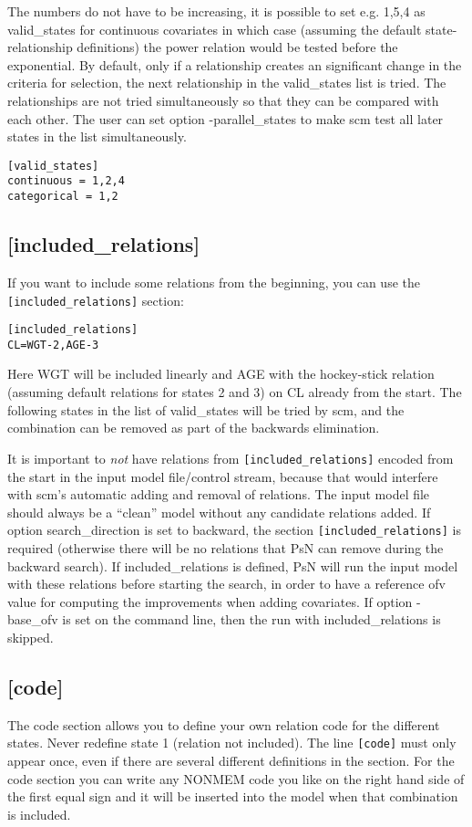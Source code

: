 The numbers do not have to be increasing, it is possible to set e.g. 1,5,4 as valid\_states for continuous covariates in which case (assuming the default state-relationship definitions) the power relation would be tested before the exponential. By default, only if a relationship creates an significant change in the criteria for selection, the next relationship in the valid\_states list is tried. The relationships are not tried simultaneously so that they can be compared with each other. The user can set option -parallel\_states to make scm test all later states in the list simultaneously.

\begin{verbatim}
[valid_states]
continuous = 1,2,4
categorical = 1,2
\end{verbatim}

\subsection{[included\_relations]}
If you want to include some relations from the beginning, you can use the 
\verb|[included_relations]| 
section:

\begin{verbatim}
[included_relations]
CL=WGT-2,AGE-3
\end{verbatim}

Here WGT will be included linearly and AGE with the hockey-stick relation (assuming default relations for states 2 and 3) on CL already from the start. The following states in the list of valid\_states will be tried by scm, and the combination can be removed as part of the backwards elimination. 

It is important to \emph{not} have relations from \verb|[included_relations]| encoded from the start in the input model file/control stream, because that would interfere with scm's automatic adding and removal of relations. The input model file should always be a ``clean'' model without any candidate relations added. If option search\_direction is set to backward, the section \verb|[included_relations]| is required (otherwise there will be no relations that PsN can remove during the backward search). If included\_relations is defined, PsN will run the input model with these relations before starting the search, in order to have a reference ofv value for computing the improvements when adding covariates. If option -base\_ofv is set on the command line, then the run with included\_relations is skipped. 

\subsection{[code]}
The code section allows you to define your own relation code for the different states. Never redefine state 1 (relation not included). The line \verb|[code]| must only appear once, even if there are several different definitions in the section. For the code section you can write any NONMEM code you like on the right hand side of the first equal sign and it will be inserted into the model when that combination is included. 

